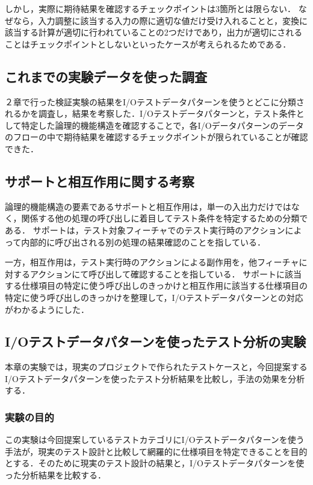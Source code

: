 \documentclass[a4paper,10pt]{jreport}
\begin{document}
しかし，実際に期待結果を確認するチェックポイントは3箇所とは限らない．
なぜなら，入力調整に該当する入力の際に適切な値だけ受け入れることと，変換に該当する計算が適切に行われていることの2つだけであり，出力が適切にされることはチェックポイントとしないといったケースが考えられるためである．


\subsection{これまでの実験データを使った調査}
２章で行った検証実験の結果をI/Oテストデータパターンを使うとどこに分類されるかを調査し，結果を考察した．I/Oテストデータパターンと，テスト条件として特定した論理的機能構造を確認することで，各I/Oデータパターンのデータのフローの中で期待結果を確認するチェックポイントが限られていることが確認できた．

\subsection{サポートと相互作用に関する考察}
論理的機能構造の要素であるサポートと相互作用は，単一の入出力だけではなく，関係する他の処理の呼び出しに着目してテスト条件を特定するための分類である．
サポートは，テスト対象フィーチャでのテスト実行時のアクションによって内部的に呼び出される別の処理の結果確認のことを指している．

一方，相互作用は，テスト実行時のアクションによる副作用を，他フィーチャに対するアクションにて呼び出して確認することを指している．
サポートに該当する仕様項目の特定に使う呼び出しのきっかけと相互作用に該当する仕様項目の特定に使う呼び出しのきっかけを整理して，I/Oテストデータパターンとの対応がわかるようにした．

\subsection{I/Oテストデータパターンを使ったテスト分析の実験}
本章の実験では，現実のプロジェクトで作られたテストケースと，今回提案するI/Oテストデータパターンを使ったテスト分析結果を比較し，手法の効果を分析する．

\subsubsection{実験の目的}
この実験は今回提案しているテストカテゴリにI/Oテストデータパターンを使う手法が，現実のテスト設計と比較して網羅的に仕様項目を特定できることを目的とする．そのために現実のテスト設計の結果と，I/Oテストデータパターンを使った分析結果を比較する．
\end{document}
